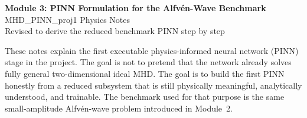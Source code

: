 \documentclass[11pt]{article}
\begin{document}
\begin{center}
    {\LARGE\bfseries Module 3: PINN Formulation for the Alfv\'en-Wave Benchmark}\\[0.6em]
    {\large MHD\_PINN\_proj1 Physics Notes}\\[0.4em]
    {\normalsize Revised to derive the reduced benchmark PINN step by step}
\end{center}

\vspace{0.8em}

\begin{overviewbox}
These notes explain the first executable physics-informed neural network (PINN) stage in the project.
The goal is not to pretend that the network already solves fully general two-dimensional ideal MHD. The goal is to build the first PINN honestly from a reduced subsystem that is still physically meaningful, analytically understood, and trainable.
The benchmark used for that purpose is the same small-amplitude Alfv\'en-wave problem introduced in Module~2.
\end{overviewbox}
\end{document}
